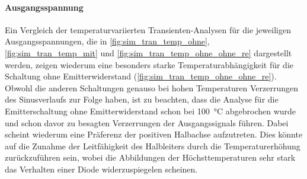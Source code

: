 \documentclass[12pt,english,ngerman]{scrartcl}
\begin{document}
\paragraph{Ausgangsspannung}
Ein Vergleich der temperaturvariierten Transienten-Analysen für die jeweiligen Ausgangsspannungen, die in \autoref{fig:sim_tran_temp_ohne},
\autoref{fig:sim_tran_temp_mit} und \autoref{fig:sim_tran_temp_ohne_ohne_re} dargestellt werden, zeigen wiederum eine besonders starke Temperaturabhängigkeit 
für die Schaltung ohne Emitterwiderstand (\autoref{fig:sim_tran_temp_ohne_ohne_re}). Obwohl die anderen Schaltungen genauso bei hohen Temperaturen Verzerrungen
des Sinusverlaufs zur Folge haben, ist zu beachten, dass die Analyse für die Emitterschaltung ohne Emitterwiderstand schon bei \SI{100}{\celsius} abgebrochen wurde und schon 
davor zu besagten Verzerrungen der Ausgangssignals führen. Dabei scheint wiederum eine Präferenz der positiven Halbachse
aufzutreten. Dies könnte auf die Zunahme der Leitfähigkeit des Halbleiters durch die Temperaturerhöhung zurückzuführen sein, wobei die Abbildungen der
Höchsttemperaturen sehr stark das Verhalten einer Diode widerzuspiegelen scheinen.





\end{document}
